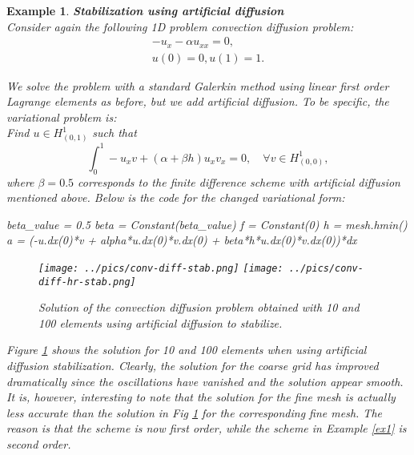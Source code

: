 \documentclass[a4paper,11pt]{amsart}
\newtheorem{example}{Example}[section]
\begin{document}
\begin{example}{\textbf{Stabilization using artificial diffusion}} \label{ex2} \\
Consider again the following 1D problem convection diffusion problem: 
\begin{eqnarray}
-u_x - \alpha u_{xx} = 0, \\ 
u(0) = 0, u(1) = 1 . 
\end{eqnarray}

We solve the problem with a standard Galerkin method using linear first
order Lagrange elements as before, but we add artificial diffusion. To be specific, the variational problem is:  \\   
Find $u \in H^1_{(0,1)}$ such that 
\[
\int_0^1 -u_x v + (\alpha + \beta h) u_x v_x = 0, \quad \forall v \in H^1_{(0,0)},    
\]
where $\beta=0.5$ corresponds to the finite difference scheme with artificial diffusion mentioned
above.  Below is the code for the changed variational form:

\begin{python}
  beta_value = 0.5 
  beta = Constant(beta_value)
  f = Constant(0)
  h = mesh.hmin()
  a = (-u.dx(0)*v + alpha*u.dx(0)*v.dx(0) + beta*h*u.dx(0)*v.dx(0))*dx  
\end{python}

\begin{figure}
\begin{center}
\texttt{[image: ../pics/conv-diff-stab.png]}
\texttt{[image: ../pics/conv-diff-hr-stab.png]}
\caption{Solution of the convection diffusion problem obtained with 10 and 100 elements
using artificial diffusion to stabilize.}
\label{fig:conv2}
\end{center}
\end{figure}

Figure \ref{fig:conv2} shows the solution for 10 and 100 elements when using artificial diffusion 
stabilization.  Clearly, the solution for the coarse grid has improved dramatically since the
oscillations have vanished and the solution appear smooth. It is, however, interesting to note
that the solution for the fine mesh is actually less accurate than the solution in Fig \ref{fig:conv2} 
for the corresponding fine mesh. The reason is that the scheme is now first order, while the 
scheme in Example \ref{ex1} is second order.    
\end{example}
\end{document}

